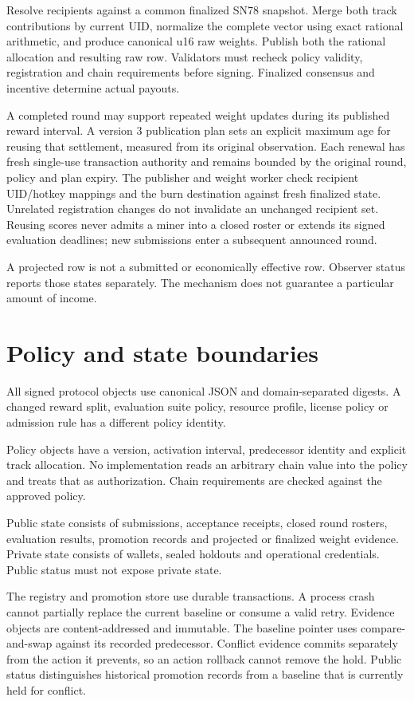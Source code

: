 Resolve recipients against a common finalized SN78 snapshot. Merge both
track contributions by current UID, normalize the complete vector using
exact rational arithmetic, and produce canonical u16 raw weights.
Publish both the rational allocation and resulting raw row. Validators
must recheck policy validity, registration and chain requirements before
signing. Finalized consensus and incentive determine actual payouts.

A completed round may support repeated weight updates during its published
reward interval. A version 3 publication plan sets an explicit maximum age for
reusing that settlement, measured from its original observation. Each renewal
has fresh single-use transaction authority and remains bounded by the original
round, policy and plan expiry. The publisher and weight worker check recipient
UID/hotkey mappings and the burn destination against fresh finalized state.
Unrelated registration changes do not invalidate an unchanged recipient set.
Reusing scores never admits a miner into a closed roster or extends its signed
evaluation deadlines; new submissions enter a subsequent announced round.

A projected row is not a submitted or economically effective row.
Observer status reports those states separately. The mechanism does not
guarantee a particular amount of income.

\section{Policy and state boundaries}\label{8-policy-and-state-boundaries}

All signed protocol objects use canonical JSON and domain-separated digests.
A changed reward split, evaluation suite policy, resource profile,
license policy or admission rule has a different policy identity.

Policy objects have a version, activation interval, predecessor identity
and explicit track allocation. No implementation reads an arbitrary chain
value into the policy and treats that as authorization. Chain requirements
are checked against the approved policy.

Public state consists of submissions, acceptance receipts, closed round
rosters, evaluation results, promotion records and projected or finalized
weight evidence. Private state consists of wallets, sealed holdouts and
operational credentials. Public status must not expose private state.

The registry and promotion store use durable transactions. A process crash
cannot partially replace the current baseline or consume a valid retry.
Evidence objects are content-addressed and immutable. The baseline pointer
uses compare-and-swap against its recorded predecessor.
Conflict evidence commits separately from the action it prevents, so an action
rollback cannot remove the hold. Public status distinguishes historical
promotion records from a baseline that is currently held for conflict.

